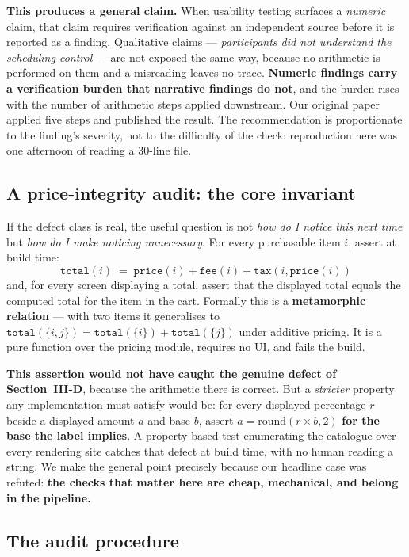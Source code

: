 \documentclass[conference]{IEEEtran}
\begin{document}
\textbf{This produces a general claim.} When usability testing surfaces a \emph{numeric} claim, that
claim requires verification against an independent source before it is reported as a finding. Qualitative
claims --- \emph{participants did not understand the scheduling control} --- are not exposed the same
way, because no arithmetic is performed on them and a misreading leaves no trace. \textbf{Numeric
findings carry a verification burden that narrative findings do not}, and the burden rises with the number
of arithmetic steps applied downstream. Our original paper applied five steps and published the result.
The recommendation is proportionate to the finding's severity, not to the difficulty of the check:
reproduction here was one afternoon of reading a 30-line file.

\subsection{A price-integrity audit: the core invariant}

If the defect class is real, the useful question is not \emph{how do I notice this next time} but \emph{how
do I make noticing unnecessary}. For every purchasable item $i$, assert at build time:
\[
  \texttt{total}(i) \;=\; \texttt{price}(i) + \texttt{fee}(i) + \texttt{tax}(i, \texttt{price}(i))
\]
and, for every screen displaying a total, assert that the displayed total equals the computed total for
the item in the cart. Formally this is a \textbf{metamorphic relation} --- with two items it generalises
to $\texttt{total}(\{i,j\}) = \texttt{total}(\{i\}) + \texttt{total}(\{j\})$ under additive pricing. It
is a pure function over the pricing module, requires no UI, and fails the build.

\textbf{This assertion would not have caught the genuine defect of Section~III-D}, because the arithmetic
there is correct. But a \emph{stricter} property any implementation must satisfy would be: for every
displayed percentage $r$ beside a displayed amount $a$ and base $b$, assert
$a = \mathrm{round}(r \times b, 2)$ \textbf{for the base the label implies}. A property-based test
enumerating the catalogue over every rendering site catches that defect at build time, with no human
reading a string. We make the general point precisely because our headline case was refuted:
\textbf{the checks that matter here are cheap, mechanical, and belong in the pipeline.}

\subsection{The audit procedure}
\end{document}

